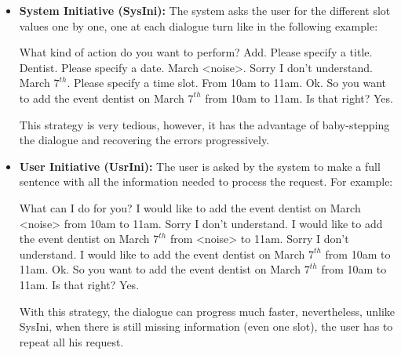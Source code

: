       \begin{itemize}
          \item \textbf{System Initiative (SysIni):} The system asks the user for the different slot values one by one, one at each dialogue turn like in the following example:

              \begin{dialogue}
                   What kind of action do you want to perform?
                   Add.
                   Please specify a title.
                   Dentist.
                   Please specify a date.
                   March <noise>.
                   Sorry I don't understand.
                   March $7^{th}$.
                   Please specify a time slot.
                   From 10am to 11am.
                   Ok. So you want to add the event dentist on March $7^{th}$ from 10am to 11am. Is that right?
                   Yes.
              \end{dialogue}

              This strategy is very tedious, however, it has the advantage of baby-stepping the dialogue and recovering the errors progressively.

          \item \textbf{User Initiative (UsrIni):} The user is asked by the system to make a full sentence with all the information needed to process the request. For example:

              \begin{dialogue}
                   What can I do for you?
                   I would like to add the event dentist on March <noise> from 10am to 11am.
                   Sorry I don't understand.
                   I would like to add the event dentist on March $7^{th}$ from <noise> to 11am.
                   Sorry I don't understand.
                   I would like to add the event dentist on March $7^{th}$ from 10am to 11am.
                   Ok. So you want to add the event dentist on March $7^{th}$ from 10am to 11am. Is that right?
                   Yes.
              \end{dialogue}

              With this strategy, the dialogue can progress much faster, nevertheless, unlike SysIni, when there is still missing information (even one slot), the user has to repeat all his request.


\end{itemize}
